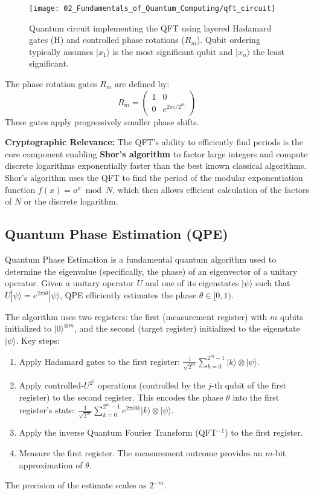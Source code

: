 \begin{figure}[h]
    \centering
    \texttt{[image: 02\_Fundamentals\_of\_Quantum\_Computing/qft\_circuit]}
    \caption{Quantum circuit implementing the QFT using layered Hadamard gates (H) and controlled phase rotations ($R_m$). Qubit ordering typically assumes $|x_1\rangle$ is the most significant qubit and $|x_n\rangle$ the least significant.}
    \label{fig:qft_circuit}
\end{figure}

The phase rotation gates $R_m$ are defined by:
\begin{equation}\label{eq:phase_gate}
    R_m = \begin{pmatrix} 1 & 0 \\ 0 & e^{2\pi i /2^m} \end{pmatrix}
\end{equation}
These gates apply progressively smaller phase shifts.

\textbf{Cryptographic Relevance:} The QFT's ability to efficiently find periods is the core component enabling \textbf{Shor's algorithm} to factor large integers and compute discrete logarithms exponentially faster than the best known classical algorithms. Shor's algorithm uses the QFT to find the period of the modular exponentiation function $f(x) = a^x \bmod N$, which then allows efficient calculation of the factors of $N$ or the discrete logarithm.

\subsection{Quantum Phase Estimation (QPE)}\label{subsec:qpe}
Quantum Phase Estimation is a fundamental quantum algorithm used to determine the eigenvalue (specifically, the phase) of an eigenvector of a unitary operator. Given a unitary operator $U$ and one of its eigenstates $|\psi\rangle$ such that $U|\psi\rangle = e^{2\pi i\theta}|\psi\rangle$, QPE efficiently estimates the phase $\theta \in [0, 1)$.

The algorithm uses two registers: the first (measurement register) with $m$ qubits initialized to $|0\rangle^{\otimes m}$, and the second (target register) initialized to the eigenstate $|\psi\rangle$.
Key steps:
\begin{enumerate}
    \item Apply Hadamard gates to the first register: $\frac{1}{\sqrt{2^m}}\sum_{k=0}^{2^m-1}|k\rangle \otimes |\psi\rangle$.
    \item Apply controlled-$U^{2^j}$ operations (controlled by the $j$-th qubit of the first register) to the second register. This encodes the phase $\theta$ into the first register's state: $\frac{1}{\sqrt{2^m}} \sum_{k=0}^{2^m-1} e^{2\pi i\theta k} |k\rangle \otimes |\psi\rangle$.
    \item Apply the inverse Quantum Fourier Transform (QFT$^{-1}$) to the first register.
    \item Measure the first register. The measurement outcome provides an $m$-bit approximation of $\theta$.
\end{enumerate}
The precision of the estimate scales as $2^{-m}$.

